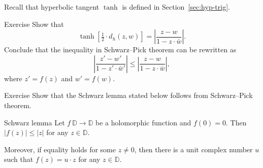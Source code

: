 Recall that hyperbolic tangent $\tanh$ is defined in Section~\ref{sec:hyp-trig}.

\begin{thm}{Exercise}\label{ex:schwarz-tanh}
Show that 
\[\tanh [\tfrac12\cdot d_h(z,w)]=\left|\frac{z-w}{1-z\cdot\bar w}\right|.\]
Conclude that the inequality in Schwarz--Pick theorem can be rewritten as
\[\left|\frac{z'-w'}{1-z'\cdot\bar w'}\right|\le\left|\frac{z-w}{1-z\cdot\bar w}\right|,\]
where
$z'=f(z)$ and $w'=f(w)$.
\end{thm}

\begin{thm}{Exercise}\label{ex:schwarz}
Show that the Schwarz lemma stated below 
follows from Schwarz--Pick theorem.
\end{thm}

\begin{thm}{Schwarz lemma}
Let $f\: \mathbb{D}\to \mathbb{D}$ be a holomorphic function
and $f(0)=0$.
Then 
$|f(z)|\le |z|$
for any $z\in \mathbb{D}$.

Moreover, if equality holds for some $z\ne 0$, then there is a unit complex number $u$ 
such that 
$f(z)=u\cdot z$
for any $z\in\mathbb{D}$.
\end{thm}
